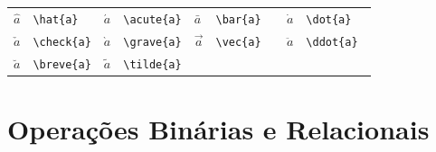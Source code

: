 \documentclass[fleqn]{profmat-cefet}
\begin{document}
\begin{spacing}{1}
\begin{longtable}{p{4mm}p{25mm}p{4mm}p{25mm}p{4mm}p{25mm}p{4mm}p{25mm}} \hline
  $\hat{a}  $ & \lstinline!\hat{a}  ! &
  $\acute{a}$ & \lstinline!\acute{a}! &
  $\bar{a}  $ & \lstinline!\bar{a}  ! &
  $\dot{a}  $ & \lstinline!\dot{a}  ! \\
  $\check{a}$ & \lstinline!\check{a}! &
  $\grave{a}$ & \lstinline!\grave{a}! &
  $\vec{a}  $ & \lstinline!\vec{a}  ! &
  $\ddot{a} $ & \lstinline!\ddot{a} ! \\
  $\breve{a}$ & \lstinline!\breve{a}! &
  $\tilde{a}$ & \lstinline!\tilde{a}! \\ \hline
\end{longtable}

\section{Operações Binárias e Relacionais}


\end{spacing}
\end{document}
